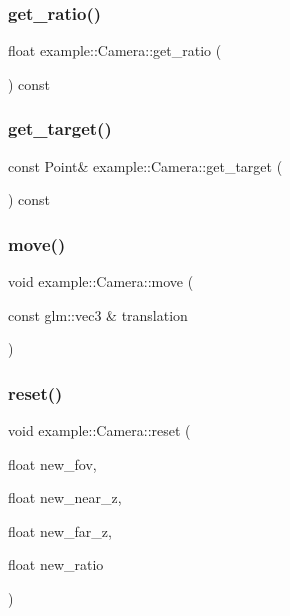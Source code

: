 \subsubsection{\texorpdfstring{get\+\_\+ratio()}{get\_ratio()}}
{\footnotesize\ttfamily float example\+::\+Camera\+::get\+\_\+ratio (\begin{DoxyParamCaption}{ }\end{DoxyParamCaption}) const\hspace{0.3cm}{\ttfamily [inline]}}

\mbox{\label{classexample_1_1_camera_a559bad945679ef774c9979e45880c9dc}} 
\subsubsection{\texorpdfstring{get\+\_\+target()}{get\_target()}}
{\footnotesize\ttfamily const Point\& example\+::\+Camera\+::get\+\_\+target (\begin{DoxyParamCaption}{ }\end{DoxyParamCaption}) const\hspace{0.3cm}{\ttfamily [inline]}}

\mbox{\label{classexample_1_1_camera_a076f2b136b38a50738827c93712689e4}} 
\subsubsection{\texorpdfstring{move()}{move()}}
{\footnotesize\ttfamily void example\+::\+Camera\+::move (\begin{DoxyParamCaption}\item[{const glm\+::vec3 \&}]{translation }\end{DoxyParamCaption})\hspace{0.3cm}{\ttfamily [inline]}}

\mbox{\label{classexample_1_1_camera_a5c8b855f8570626c91bc25f7014fb90e}} 
\subsubsection{\texorpdfstring{reset()}{reset()}}
{\footnotesize\ttfamily void example\+::\+Camera\+::reset (\begin{DoxyParamCaption}\item[{float}]{new\+\_\+fov,  }\item[{float}]{new\+\_\+near\+\_\+z,  }\item[{float}]{new\+\_\+far\+\_\+z,  }\item[{float}]{new\+\_\+ratio }\end{DoxyParamCaption})\hspace{0.3cm}{\ttfamily [inline]}}

